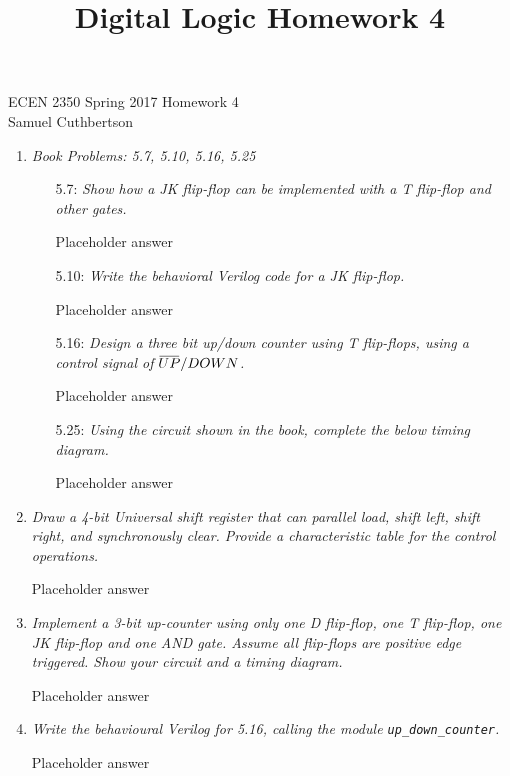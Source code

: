 \documentclass[12pt]{article}
\newcommand{\overbar}[1]
    {\mkern1.5mu\overline{\mkern-1.5mu#1\mkern-1.5mu}\mkern1.5mu}
\begin{document}
\title{Digital Logic Homework 4}

ECEN 2350 Spring 2017 \hfill Homework 4\\
Samuel Cuthbertson

\hrulefill{}
\begin{enumerate}
  \item \textit{Book Problems: 5.7, 5.10, 5.16, 5.25}
  \begin{enumerate}
    \item[5.7:] \textit{Show how a JK flip-flop can be implemented with a T
                        flip-flop and other gates.}

      Placeholder answer

    \item[5.10:] \textit{Write the behavioral Verilog code for a JK flip-flop.}

      Placeholder answer

    \item[5.16:] \textit{Design a three bit up/down counter using T flip-flops,
                        using a control signal of $\overbar{UP}/DOWN$.}

      Placeholder answer

    \item[5.25:] \textit{Using the circuit shown in the book, complete the
                         below timing diagram.}

      Placeholder answer

  \end{enumerate}

  \item \textit{Draw a 4-bit Universal shift register that can parallel load,
                shift left, shift right, and synchronously clear. Provide a
                characteristic table for the control operations.}

    Placeholder answer

  \item \textit{Implement a 3-bit up-counter using only one D flip-flop, one
                T flip-flop, one JK flip-flop and one AND gate. Assume all
                flip-flops are positive edge triggered. Show your circuit and
                a timing diagram.}

    Placeholder answer

  \item \textit{Write the behavioural Verilog for 5.16, calling the module
                \texttt{up\_down\_counter}.}

    Placeholder answer
\end{enumerate}
\end{document}
